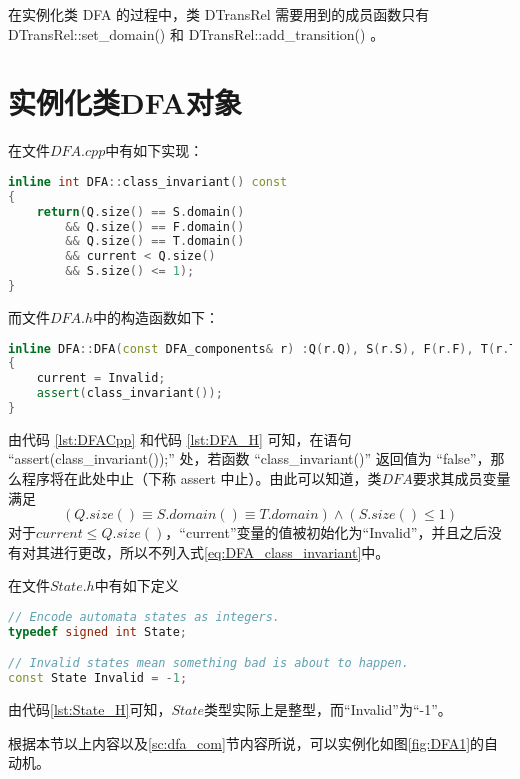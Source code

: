 在实例化类 DFA 的过程中，类 DTransRel 需要用到的成员函数只有 DTransRel::set\_domain() 和 DTransRel::add\_transition() 。







\section{实例化类DFA对象}\label{sec:get_a_dfa}

在文件$DFA.cpp$中有如下实现：
\lstset{style=mystyle}
\begin{lstlisting}[language=C++,label={lst:DFACpp},caption={DFA.cpp}]
inline int DFA::class_invariant() const
{
	return(Q.size() == S.domain()
		&& Q.size() == F.domain()
		&& Q.size() == T.domain()
		&& current < Q.size()
		&& S.size() <= 1);
}
\end{lstlisting}
而文件$DFA.h$中的构造函数如下：
\lstset{style=mystyle}
\begin{lstlisting}[language=C++,label={lst:DFA_H},caption={DFA.h}]
inline DFA::DFA(const DFA_components& r) :Q(r.Q), S(r.S), F(r.F), T(r.T)
{
	current = Invalid;
	assert(class_invariant());
}
\end{lstlisting}
由代码 \ref{lst:DFACpp} 和代码 \ref{lst:DFA_H} 可知，在语句 “assert(class\_invariant());” 处，若函数 “class\_invariant()” 返回值为 “false”，那么程序将在此处中止\cite{assert_abort}（下称 assert 中止）。由此可以知道，类$DFA$要求其成员变量满足
\begin{equation}\label{eq:DFA_class_invariant}
    (Q.size() \equiv S.domain() \equiv T.domain ) \land (S.size() \leq 1)
\end{equation}
对于$current \le Q.size() $，“current”变量的值被初始化为“Invalid”，并且之后没有对其进行更改，所以不列入式\ref{eq:DFA_class_invariant}中。

在文件$State.h$中有如下定义
\lstset{style=mystyle}
\begin{lstlisting}[language=C++,label={lst:State_H},caption={State.h}]
// Encode automata states as integers.
typedef signed int State;

// Invalid states mean something bad is about to happen.
const State Invalid = -1;
\end{lstlisting}
由代码\ref{lst:State_H}可知，$State$类型实际上是整型，而“Invalid”为“-1”。

根据本节以上内容以及\ref{sc:dfa_com}节内容所说，可以实例化如图\ref{fig:DFA1}的自动机。

